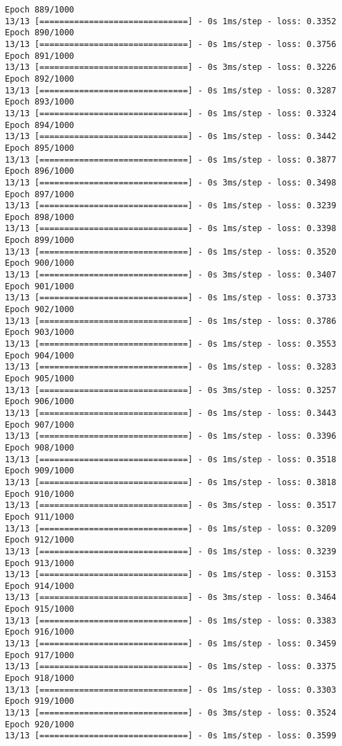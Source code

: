 \documentclass[11pt]{article}
\begin{document}
\begin{Verbatim}[commandchars=\\\{\}]
Epoch 889/1000
13/13 [==============================] - 0s 1ms/step - loss: 0.3352
Epoch 890/1000
13/13 [==============================] - 0s 1ms/step - loss: 0.3756
Epoch 891/1000
13/13 [==============================] - 0s 3ms/step - loss: 0.3226
Epoch 892/1000
13/13 [==============================] - 0s 1ms/step - loss: 0.3287
Epoch 893/1000
13/13 [==============================] - 0s 1ms/step - loss: 0.3324
Epoch 894/1000
13/13 [==============================] - 0s 1ms/step - loss: 0.3442
Epoch 895/1000
13/13 [==============================] - 0s 1ms/step - loss: 0.3877
Epoch 896/1000
13/13 [==============================] - 0s 3ms/step - loss: 0.3498
Epoch 897/1000
13/13 [==============================] - 0s 1ms/step - loss: 0.3239
Epoch 898/1000
13/13 [==============================] - 0s 1ms/step - loss: 0.3398
Epoch 899/1000
13/13 [==============================] - 0s 1ms/step - loss: 0.3520
Epoch 900/1000
13/13 [==============================] - 0s 3ms/step - loss: 0.3407
Epoch 901/1000
13/13 [==============================] - 0s 1ms/step - loss: 0.3733
Epoch 902/1000
13/13 [==============================] - 0s 1ms/step - loss: 0.3786
Epoch 903/1000
13/13 [==============================] - 0s 1ms/step - loss: 0.3553
Epoch 904/1000
13/13 [==============================] - 0s 1ms/step - loss: 0.3283
Epoch 905/1000
13/13 [==============================] - 0s 3ms/step - loss: 0.3257
Epoch 906/1000
13/13 [==============================] - 0s 1ms/step - loss: 0.3443
Epoch 907/1000
13/13 [==============================] - 0s 1ms/step - loss: 0.3396
Epoch 908/1000
13/13 [==============================] - 0s 1ms/step - loss: 0.3518
Epoch 909/1000
13/13 [==============================] - 0s 1ms/step - loss: 0.3818
Epoch 910/1000
13/13 [==============================] - 0s 3ms/step - loss: 0.3517
Epoch 911/1000
13/13 [==============================] - 0s 1ms/step - loss: 0.3209
Epoch 912/1000
13/13 [==============================] - 0s 1ms/step - loss: 0.3239
Epoch 913/1000
13/13 [==============================] - 0s 1ms/step - loss: 0.3153
Epoch 914/1000
13/13 [==============================] - 0s 3ms/step - loss: 0.3464
Epoch 915/1000
13/13 [==============================] - 0s 1ms/step - loss: 0.3383
Epoch 916/1000
13/13 [==============================] - 0s 1ms/step - loss: 0.3459
Epoch 917/1000
13/13 [==============================] - 0s 1ms/step - loss: 0.3375
Epoch 918/1000
13/13 [==============================] - 0s 1ms/step - loss: 0.3303
Epoch 919/1000
13/13 [==============================] - 0s 3ms/step - loss: 0.3524
Epoch 920/1000
13/13 [==============================] - 0s 1ms/step - loss: 0.3599

\end{Verbatim}
\end{document}
